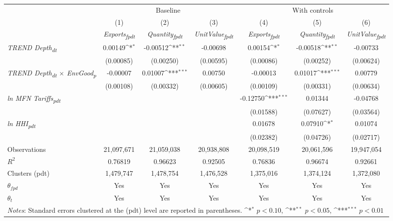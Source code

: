 {
\def\sym#1{\ifmmode^{#1}\else\(^{#1}\)\fi}
\begin{tabular}{l*{6}{c}}
\toprule
&\multicolumn{3}{c}{Baseline}&\multicolumn{3}{c}{With controls}\\\cmidrule(lr){2-4}\cmidrule(lr){5-7}
&(1)&(2)&(3)&(4)&(5)&(6)\\
&\textit{Exports\textsubscript{fpdt}}&\textit{Quantity\textsubscript{fpdt}}&\textit{UnitValue\textsubscript{fpdt}}&\textit{Exports\textsubscript{fpdt}}&\textit{Quantity\textsubscript{fpdt}}&\textit{UnitValue\textsubscript{fpdt}}\\
\midrule
\textit{TREND Depth\textsubscript{dt}} & 0.00149\sym{*} & -0.00512\sym{**} & -0.00698 & 0.00154\sym{*} & -0.00518\sym{**} & -0.00733\\
 & (0.00085) & (0.00250) & (0.00595) & (0.00086) & (0.00252) & (0.00624)\\
\addlinespace
\textit{TREND Depth\textsubscript{dt} $\times$ EnvGood\textsubscript{p}} & -0.00007 & 0.01007\sym{***} & 0.00750 & -0.00013 & 0.01017\sym{***} & 0.00779\\
 & (0.00108) & (0.00332) & (0.00605) & (0.00109) & (0.00331) & (0.00634)\\
\addlinespace
\textit{ln MFN Tariffs\textsubscript{pdt}} &  &  &  & -0.12750\sym{***} & 0.01344 & -0.04768\\
 &  &  &  & (0.01588) & (0.07627) & (0.03564)\\
\addlinespace
\textit{ln HHI\textsubscript{pdt}} &  &  &  & 0.01678 & 0.07910\sym{*} & 0.01074\\
 &  &  &  & (0.02382) & (0.04726) & (0.02717)\\
\midrule
Observations & 21,097,671 & 21,059,038 & 20,938,808 & 20,098,519 & 20,061,596 & 19,947,054\\
$R^{2}$ & 0.76819 & 0.96623 & 0.92505 & 0.76836 & 0.96674 & 0.92661\\
Clusters (pdt) & 1,479,747 & 1,478,754 & 1,476,528 & 1,375,016 & 1,374,124 & 1,372,080\\
$\theta_{fpd}$ & Yes & Yes & Yes & Yes & Yes & Yes\\
$\theta_{t}$ & Yes & Yes & Yes & Yes & Yes & Yes\\
\bottomrule
\multicolumn{7}{l}{\footnotesize \textit{Notes}: Standard errors clustered at the (pdt) level are reported in parentheses. \sym{*} \(p<0.10\), \sym{**} \(p<0.05\), \sym{***} \(p<0.01\)}\\
\end{tabular}
}
